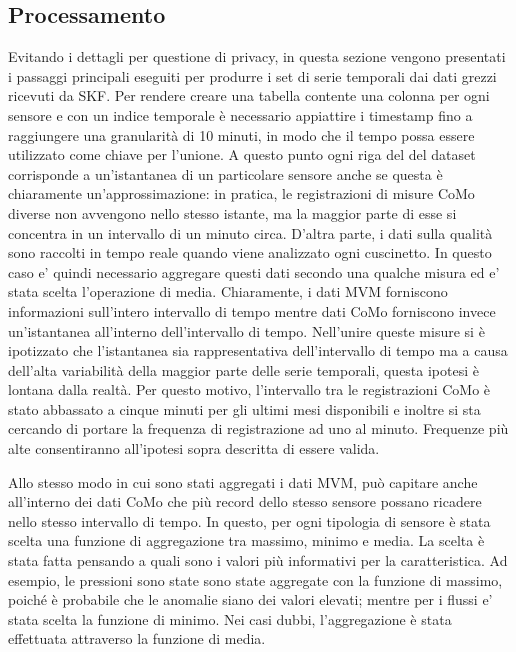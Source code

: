 \subsection{Processamento}
Evitando i dettagli per questione di privacy, in questa sezione vengono presentati i passaggi principali eseguiti per produrre i set di serie temporali dai dati grezzi ricevuti da SKF. 
Per rendere creare una tabella contente una colonna per ogni sensore e con un indice temporale è necessario appiattire i timestamp fino a raggiungere una granularità di 10 minuti, in modo che il tempo possa essere utilizzato come chiave per l'unione. A questo punto ogni riga del del dataset corrisponde a un'istantanea di un particolare sensore anche se questa è chiaramente un'approssimazione: in pratica, le registrazioni di misure CoMo diverse non avvengono nello stesso istante, ma la maggior parte di esse si concentra in un intervallo di un minuto circa. 
D'altra parte, i dati sulla qualità sono raccolti in tempo reale quando viene analizzato ogni cuscinetto. In questo caso e' quindi necessario aggregare questi dati secondo una qualche misura ed e' stata scelta l'operazione di media.
Chiaramente, i dati MVM forniscono informazioni sull'intero intervallo di tempo mentre dati CoMo forniscono invece un'istantanea all'interno dell'intervallo di tempo.
Nell'unire queste misure si è ipotizzato che l'istantanea sia rappresentativa dell'intervallo di tempo ma a causa dell'alta variabilità della maggior parte delle serie temporali, questa ipotesi è lontana dalla realtà.
Per questo motivo, l'intervallo tra le registrazioni CoMo è stato abbassato a cinque minuti per gli ultimi mesi disponibili e inoltre si sta cercando di portare la frequenza di registrazione ad uno al minuto. Frequenze più alte consentiranno all'ipotesi sopra descritta di essere valida.

Allo stesso modo in cui sono stati aggregati i dati MVM, può capitare anche all'interno dei dati CoMo che più record dello stesso sensore possano ricadere nello stesso intervallo di tempo. In questo, per ogni tipologia di sensore è stata scelta una funzione di aggregazione tra massimo, minimo e media. La scelta è stata fatta pensando a quali sono i valori più informativi per la caratteristica. Ad esempio, le pressioni sono state sono state aggregate con la funzione di massimo, poiché è probabile che le anomalie siano dei valori elevati; mentre per i flussi e' stata scelta la funzione di minimo. Nei casi dubbi, l'aggregazione è stata effettuata attraverso la funzione di media.


